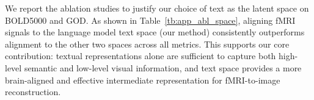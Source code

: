 We report the ablation studies to justify our choice of text as the latent space on BOLD5000 and GOD. As shown in Table~\ref{tb:app_abl_space}, aligning fMRI signals to the language model text space (our method) consistently outperforms alignment to the other two spaces across all metrics. This supports our core contribution: textual representations alone are sufficient to capture both high-level semantic and low-level visual information, and text space provides a more brain-aligned and effective intermediate representation for fMRI-to-image reconstruction.



\begin{table}[t] 
\vspace{-0.5cm}
\centering
\caption{Reconstruction performance across three latent spaces. The best result in each column is highlighted in \textcolor{red}{red}. $\uparrow$ indicates higher is better and $\downarrow$ indicates lower is better.}
\end{table}
